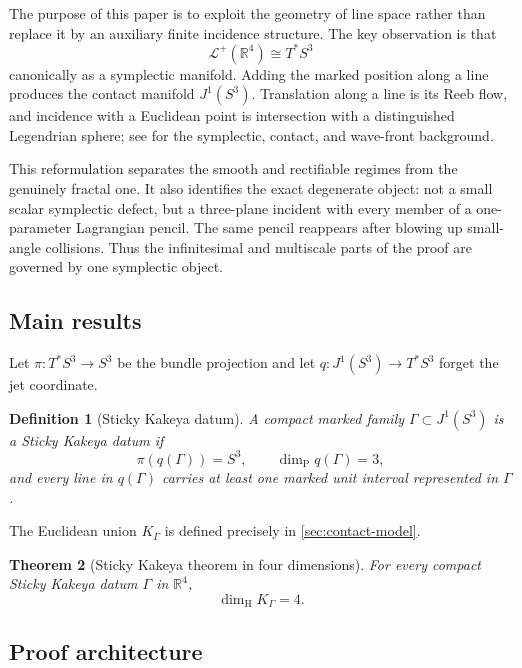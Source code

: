 \documentclass[10pt]{article}
\newtheorem{theorem}{Theorem}[section]
\newtheorem{definition}[theorem]{Definition}
\newcommand{\R}{\mathbb R}
\newcommand{\dimH}{\dim_{\mathrm H}}
\newcommand{\dimP}{\dim_{\mathrm P}}
\begin{document}
The purpose of this paper is to exploit the geometry of line space rather than replace it by
an auxiliary finite incidence structure. The key observation is that
\[
 \mathcal L^+(\R^4)\cong T^*S^3
\]
canonically as a symplectic manifold. Adding the marked position along a line produces the
contact manifold $J^1(S^3)$. Translation along a line is its Reeb flow, and incidence with a Euclidean point is
intersection with a distinguished Legendrian sphere; see
\cite{CannasDaSilva2001,Geiges2008,Arnold1990} for the symplectic, contact, and wave-front
background.

This reformulation separates the smooth and rectifiable regimes from the genuinely fractal
one. It also identifies the exact degenerate object: not a small scalar symplectic defect,
but a three-plane incident with every member of a one-parameter Lagrangian pencil. The same
pencil reappears after blowing up small-angle collisions. Thus the infinitesimal and
multiscale parts of the proof are governed by one symplectic object.

\subsection{Main results}

Let $\pi:T^*S^3\to S^3$ be the bundle projection and let
$q:J^1(S^3)\to T^*S^3$ forget the jet coordinate.

\begin{definition}[Sticky Kakeya datum]
A compact marked family $\Gamma\subset J^1(S^3)$ is a \emph{Sticky Kakeya datum} if
\[
 \pi(q(\Gamma))=S^3,
 \qquad
 \dimP q(\Gamma)=3,
\]
and every line in $q(\Gamma)$ carries at least one marked unit interval represented in
$\Gamma$.
\end{definition}

The Euclidean union $K_\Gamma$ is defined precisely in \cref{sec:contact-model}.

\begin{theorem}[Sticky Kakeya theorem in four dimensions]
\label{thm:main}
For every compact Sticky Kakeya datum $\Gamma$ in $\R^4$,
\[
 \boxed{\dimH K_\Gamma=4.}
\]
\end{theorem}

\subsection{Proof architecture}
\end{document}
